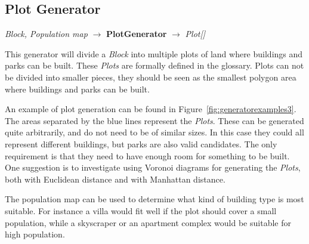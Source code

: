 \subsection{Plot Generator}
\begin{center}
    \textit{Block, Population map} $\rightarrow$ \textbf{PlotGenerator} $\rightarrow$ \textit{Plot{[}{]}}
\end{center}
This generator will divide a \textit{Block} into multiple plots of land where buildings and parks can be built.
These \textit{Plots} are formally defined in the glossary.
Plots can not be divided into smaller pieces, they should be seen as the smallest polygon area where buildings and parks can be built.

An example of plot generation can be found in Figure~\ref{fig:generatorexamples3}.
The areas separated by the blue lines represent the \textit{Plots}.
These can be generated quite arbitrarily, and do not need to be of similar sizes.
In this case they could all represent different buildings, but parks are also valid candidates.
The only requirement is that they need to have enough room for something to be built.
One suggestion is to investigate using Voronoi diagrams for generating the \textit{Plots}, both with Euclidean distance and with Manhattan distance.

The population map can be used to determine what kind of building type is most suitable.
For instance a villa would fit well if the plot should cover a small population, while a skyscraper or an apartment complex would be suitable for high population.
